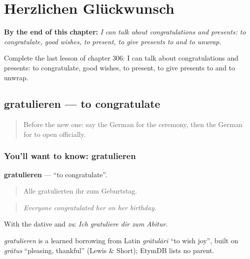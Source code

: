 
\chapter{Herzlichen Glückwunsch}
\label{ch:ge-herzlichen-gluckwunsch}

\begin{chapteropening}
\textbf{By the end of this chapter:} \emph{I can talk about congratulations and presents: to congratulate, good wishes, to present, to give presents to and to unwrap.}

Complete the last lesson of chapter 306: I can talk about congratulations and presents: to congratulate, good wishes, to present, to give presents to and to unwrap.
\end{chapteropening}

\section[gratulieren]{gratulieren — to congratulate}

\label{lesson:GE-C306-gratulieren}



\begin{quote}
Before the new one: say the German for the ceremony, then the German for to open officially.
\end{quote}

\subsection*{You'll want to know: gratulieren}
\textbf{gratulieren} — \textquotedblleft{}to congratulate\textquotedblright{}.

\begin{quote}
Alle gratulierten ihr zum Geburtstag.
\end{quote}

\begin{quote}
\emph{Everyone congratulated her on her birthday.}
\end{quote}

With the dative and \emph{zu}: \emph{Ich gratuliere dir zum Abitur}.

\begin{cousinweb}
\emph{gratulieren} is a learned borrowing from Latin \emph{grātulārī} \textquotedblleft{}to wish joy\textquotedblright{}, built on \emph{grātus} \textquotedblleft{}pleasing, thankful\textquotedblright{} (Lewis \& Short); EtymDB lists no parent.
\end{cousinweb}

